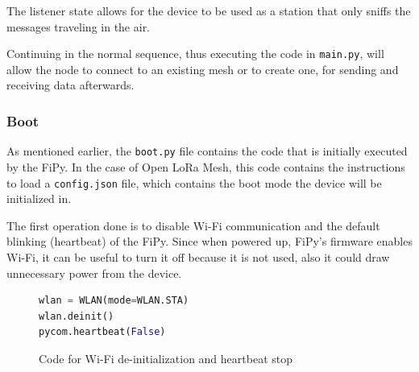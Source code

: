 				The listener state allows for the device to be used as a station that only sniffs the messages traveling in the air.
				
				Continuing in the normal sequence, thus executing the code in \texttt{main.py}, will allow the node to connect to an existing mesh or to create one, for sending and receiving data afterwards.
			
%					
%					
			
			\newpage
			\subsubsection{Boot}
			
				As mentioned earlier, the \texttt{boot.py} file contains the code that is initially executed by the FiPy.
				In the case of Open LoRa Mesh, this code contains the instructions to load a \texttt{config.json} file, which contains the boot mode the device will be initialized in.
				
				The first operation done is to disable Wi-Fi communication and the default blinking (heartbeat) of the FiPy.
				Since when powered up, FiPy's firmware enables Wi-Fi, it can be useful to turn it off because it is not used, also it could draw unnecessary power from the device.

				\begin{figure}[H]
					\begin{lstlisting}[language=Python]
wlan = WLAN(mode=WLAN.STA)
wlan.deinit()
pycom.heartbeat(False)
					\end{lstlisting}
					\label{code:boot_1}
					\caption{Code for Wi-Fi de-initialization and heartbeat stop}
				\end{figure}

